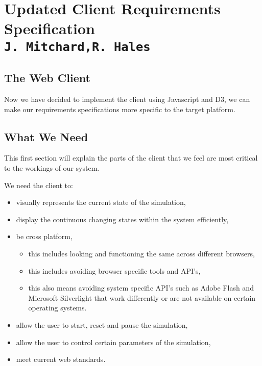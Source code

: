 \pagestyle{empty}

\section{Updated Client Requirements Specification\\{\small\tt{J.~Mitchard,R.~Hales}}}

\subsection{The Web Client}
Now we have decided to implement the client using Javascript and D3, we can make our requirements specifications more specific to the target platform.

\subsection{What We Need}
This first section will explain the parts of the client that we feel are most critical to the workings of our system. 

We need the client to:
\begin{itemize}
	\item visually represents the current state of the simulation,
	\item display the continuous changing states within the system efficiently,
	\item be cross platform,
	\begin{itemize}
		\item this includes looking and functioning the same across different browsers,
		\item this includes avoiding browser specific tools and API's,
		\item this also means avoiding system specific API's such as Adobe Flash and Microsoft Silverlight that work differently or are not available on certain operating systems.
	\end{itemize}
	\item allow the user to start, reset and pause the simulation,
	\item allow the user to control certain parameters of the simulation,
	\item meet current web standards.
\end{itemize}

